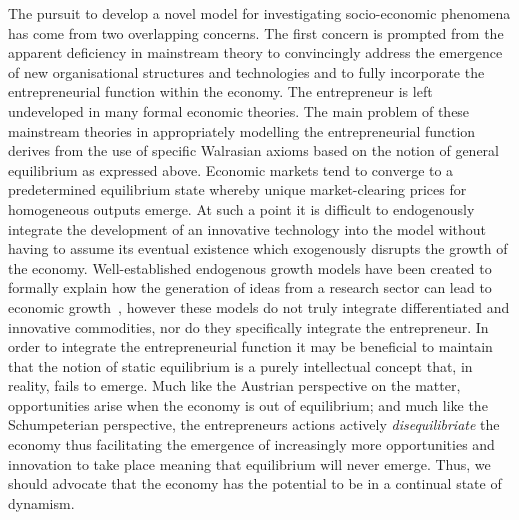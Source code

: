 The pursuit to develop a novel model for investigating socio-economic phenomena has come from two overlapping concerns. The first concern is prompted from the apparent deficiency in mainstream theory to convincingly address the emergence of new organisational structures and technologies and to fully incorporate the entrepreneurial function within the economy. The entrepreneur is left undeveloped in many formal economic theories. The main problem of these mainstream theories in appropriately modelling the entrepreneurial function derives from the use of specific Walrasian axioms based on the notion of general equilibrium as expressed above. Economic markets tend to converge to a predetermined equilibrium state whereby unique market-clearing prices for homogeneous outputs emerge. At such a point it is difficult to endogenously integrate the development of an innovative technology into the model without having to assume its eventual existence which exogenously disrupts the growth of the economy. Well-established endogenous growth models have been created to formally explain how the generation of ideas from a research sector can lead to economic growth~\citep{Romer1990}, however these models do not truly integrate differentiated and innovative commodities, nor do they specifically integrate the entrepreneur. In order to integrate the entrepreneurial function it may be beneficial to maintain that the notion of static equilibrium is a purely intellectual concept that, in reality, fails to emerge. Much like the Austrian perspective on the matter, opportunities arise when the economy is out of equilibrium; and much like the Schumpeterian perspective, the entrepreneurs actions actively \emph{disequilibriate} the economy thus facilitating the emergence of increasingly more opportunities and innovation to take place meaning that equilibrium will never emerge. Thus, we should advocate that the economy has the potential to be in a continual state of dynamism.


